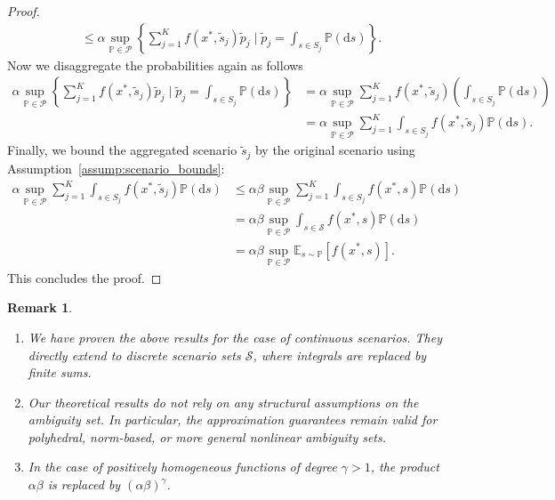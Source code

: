 \documentclass{article}
\newtheorem{remark}{Remark}
\newcommand{\mP}{\mathcal{P}}
\newcommand{\mS}{\mathcal{S}}
\newcommand{\E}{\mathbb{E}}
\newcommand{\newscen}[1]{\tilde{s}_{#1}}%
\newcommand{\prob}{\mathbb{P}}
\begin{document}
\begin{proof}
\begin{equation*}
\begin{aligned}
		\leq \alpha \sup_{\prob \in \mP} \left\{\sum_{j=1}^{K}f(x^*, \newscen{j})\tilde{p}_j \;\Big|\;\tilde{p}_j = \int_{s\in S_j}\prob(\text{d}s) \right\}.
	\end{aligned}
	\end{equation*}
	Now we disaggregate the probabilities again as follows
	\begin{equation*}
	\begin{aligned}
		\alpha \sup_{\prob \in \mP} \left\{\sum_{j=1}^{K}f(x^*, \newscen{j})\tilde{p}_j \;\Big|\; \tilde{p}_j = \int_{s\in S_j}\prob(\text{d}s) \right\} 
		&= \alpha \sup_{\prob \in \mP} \sum_{j=1}^{K}f(x^*, \newscen{j})\left(\int_{s\in S_j}\prob(\text{d}s)\right)\\
		&= \alpha \sup_{\prob \in \mP} \sum_{j=1}^{K}\int_{s\in S_j}f(x^*, \newscen{j})\prob(\text{d}s). 
	\end{aligned}
	\end{equation*}
	Finally, we bound the aggregated scenario \(\newscen{j}\) by the original scenario using Assumption~\eqref{assump:scenario_bounds}:
	\begin{equation*}
	\begin{aligned}
		\alpha \sup_{\prob \in \mP} \sum_{j=1}^{K}\int_{s\in S_j}f(x^*, \newscen{j})\prob(\text{d}s) 
		&\leq \alpha \beta \sup_{\prob \in \mP} \sum_{j=1}^{K}\int_{s\in S_j} f(x^*, s)\prob(\text{d}s) \\
		&= \alpha \beta \sup_{\prob \in \mP} \int_{s\in\mS} f(x^*, s)\prob(\text{d}s) \\
		&= \alpha \beta \sup_{\prob \in \mP} \E_{s \sim \prob}[f(x^*, s)].
	\end{aligned}
	\end{equation*}
	This concludes the proof.
\end{proof}


\begin{remark}
	\begin{enumerate}
		\item We have proven the above results for the case of continuous scenarios.
		They directly extend to discrete scenario sets \(\mS\), where integrals are replaced by finite sums. 
		
		\item Our theoretical results do not rely on any structural assumptions on the ambiguity set.
		In particular, the approximation guarantees remain valid for polyhedral, norm-based, or more general nonlinear ambiguity sets.
		
		\item In the case of positively homogeneous functions of degree \(\gamma > 1\), the product \(\alpha \beta\) is replaced by \((\alpha \beta)^{\gamma}\).
	\end{enumerate}
\end{remark}
\end{document}
